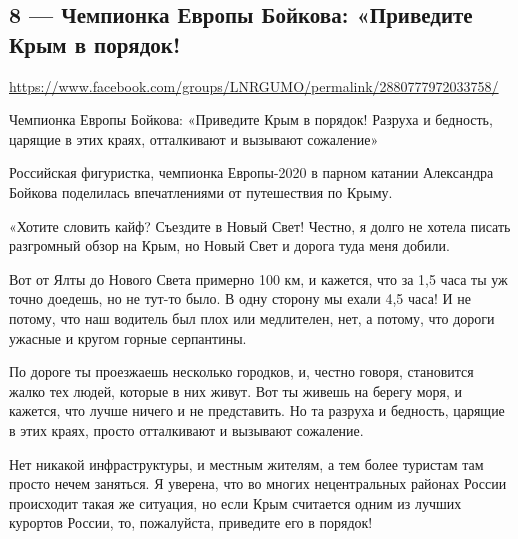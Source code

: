  
 
  
\clearpage
\subsection{8 --- Чемпионка Европы Бойкова: «Приведите Крым в порядок!}
\url{https://www.facebook.com/groups/LNRGUMO/permalink/2880777972033758/}

Чемпионка Европы Бойкова: «Приведите Крым в порядок! Разруха и бедность,
царящие в этих краях, отталкивают и вызывают сожаление»

Российская фигуристка, чемпионка Европы-2020 в парном катании Александра
Бойкова поделилась впечатлениями от путешествия по Крыму.

«Хотите словить кайф? Съездите в Новый Свет! Честно, я долго не хотела писать
разгромный обзор на Крым, но Новый Свет и дорога туда меня добили.

Вот от Ялты до Нового Света примерно 100 км, и кажется, что за 1,5 часа ты уж
точно доедешь, но не тут-то было. В одну сторону мы ехали 4,5 часа! И не
потому, что наш водитель был плох или медлителен, нет, а потому, что дороги
ужасные и кругом горные серпантины.

По дороге ты проезжаешь несколько городков, и, честно говоря, становится жалко
тех людей, которые в них живут. Вот ты живешь на берегу моря, и кажется, что
лучше ничего и не представить. Но та разруха и бедность, царящие в этих краях,
просто отталкивают и вызывают сожаление.

Нет никакой инфраструктуры, и местным жителям, а тем более туристам там просто
нечем заняться. Я уверена, что во многих нецентральных районах России
происходит такая же ситуация, но если Крым считается одним из лучших курортов
России, то, пожалуйста, приведите его в порядок!
  
